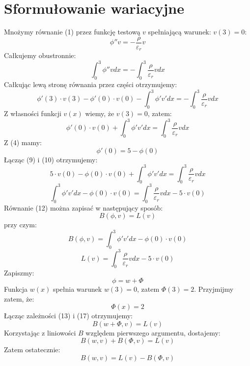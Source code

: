 \documentclass{article}
\begin{document}
	\section{Sformułowanie wariacyjne}
	Mnożymy równanie (1) przez funkcję testową $v$ spełniającą warunek: $v(3) = 0$:
	\begin{equation}
		\phi '' v = -\frac{\rho}{\varepsilon_r}v
	\end{equation}
	Całkujemy obustronnie:
	\begin{equation}
		\int_0^3 \phi '' v dx = -\int_0^3 \frac{\rho}{\varepsilon_r} v dx
	\end{equation}
	Całkując lewą stronę równania przez części otrzymujemy:
	\begin{equation}
		\phi ' (3) \cdot v(3) - \phi ' (0) \cdot v(0) - \int_0^3 \phi ' v ' dx = -\int_0^3 \frac{\rho}{\varepsilon_r} v dx
	\end{equation}
	Z własności funkcji $v(x)$ wiemy, że $v(3)=0$, zatem:
	\begin{equation}
		\phi' (0) \cdot v(0) + \int_0^3 \phi ' v ' dx = \int_0^3 \frac{\rho}{\varepsilon_r} v dx
	\end{equation}
	Z (4) mamy:
	\begin{equation}
		\phi ' (0) = 5 - \phi (0)
	\end{equation}
	Łącząc (9) i (10) otrzymujemy:
	\begin{equation}
		5 \cdot v(0) - \phi (0) \cdot v(0) + \int_0^3 \phi ' v' dx = \int_0^3 \frac{\rho}{\varepsilon_r} v dx
	\end{equation}
	\begin{equation}
		\int_0^3 \phi ' v' dx - \phi (0) \cdot v(0) = \int_0^3 \frac{\rho}{\varepsilon_r} v dx - 5 \cdot v(0)
	\end{equation}
	Równanie (12) można zapisać w następujący sposób:
	\begin{equation}
		B(\phi, v) = L(v)
	\end{equation}
	przy czym:
	\begin{equation}
		B(\phi, v) = \int_0^3 \phi ' v' dx - \phi (0) \cdot v(0)
	\end{equation}
	\begin{equation}
		L(v) = \int_0^3 \frac{\rho}{\varepsilon_r} v dx - 5 \cdot v(0)
	\end{equation}
	Zapiszmy:
	\begin{equation}
		\phi = w + \Phi
	\end{equation}
	Funkcja $w(x)$ spełnia warunek $w(3)=0$, zatem $\Phi(3) = 2$. Przyjmijmy zatem, że:
	\begin{equation}
		\Phi (x) = 2
	\end{equation}
	Łącząc zależności (13) i (17) otrzymujemy:
	\begin{equation}
		B(w+\Phi, v) = L(v)
	\end{equation}
	Korzystając z liniowości $B$ względem pierwszego argumentu, dostajemy:
	\begin{equation}
		B(w,v) + B(\Phi, v) = L(v)
	\end{equation}
	Zatem ostatecznie:
	\begin{equation}
		B(w,v) = L(v)-B(\Phi, v)
	\end{equation}
	
\end{document}
